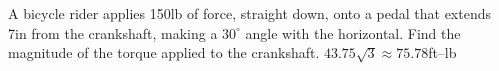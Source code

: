 {A bicycle rider applies 150lb of force, straight down, onto a pedal that extends 7in from the crankshaft, making a $30^\circ$ angle with the horizontal. Find the magnitude of the torque applied to the crankshaft.
}
{$43.75\sqrt{3}\approx 75.78$ft--lb
}

